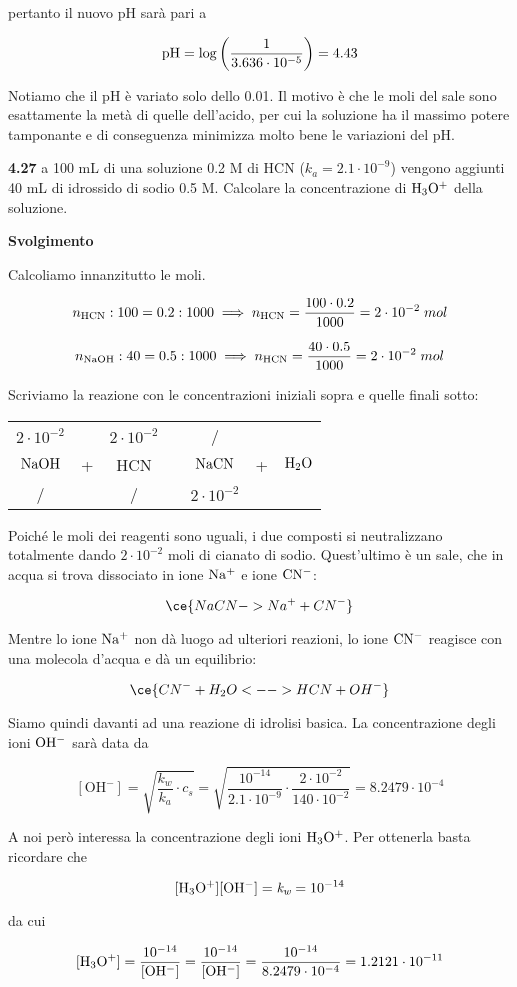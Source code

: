 pertanto il nuovo pH sarà pari a

$$\rm pH=\log{\left(\frac{1}{3.636 \cdot 10^{-5}}\right)}=4.43$$

Notiamo che il pH è variato solo dello 0.01. Il motivo è che le moli del sale sono esattamente la metà di quelle dell'acido, per cui la soluzione ha il massimo potere tamponante e di conseguenza minimizza molto bene le variazioni del pH.

\vspace{0.2cm}\textbf{4.27} a 100 mL di una soluzione 0.2 M di HCN ($k_a=2.1 \cdot 10^{-9}$) vengono aggiunti 40 mL di idrossido di sodio 0.5 M. Calcolare la concentrazione di $\rm H_3O^+$ della soluzione.

\vspace{0.2cm}\large\textbf{Svolgimento}\normalsize

Calcoliamo innanzitutto le moli.

$$n_{\rm HCN}:100=0.2:1000
\implies
n_{\rm HCN}=\frac{100 \cdot 0.2}{1000}=2 \cdot 10^{-2}\;mol$$

$$n_{\rm NaOH}:40=0.5:1000
\implies
n_{\rm HCN}=\frac{40 \cdot 0.5}{1000}=2 \cdot 10^{-2}\;mol$$

Scriviamo la reazione con le concentrazioni iniziali sopra e quelle finali sotto:

\begin{center}
    \begin{tabular}{ccccccc}
        $2 \cdot 10^{-2}$ &  & $2 \cdot 10^{-2}$ & & / &&\\
        $\rm NaOH$ & + & HCN & \ce{->} & $\rm NaCN$ & + & $\rm H_2O$\\
        / &  &  / & & $2 \cdot 10^{-2}$ &&\\
    \end{tabular}
\end{center}

Poiché le moli dei reagenti sono uguali, i due composti si neutralizzano totalmente dando $2 \cdot 10^{-2}$ moli di cianato di sodio. Quest'ultimo è un sale, che in acqua si trova dissociato in ione $\rm Na^+$ e ione $\rm CN^-$:

$$\ce{NaCN -> Na^+ + CN^-}$$

Mentre lo ione $\rm Na^+$ non dà luogo ad ulteriori reazioni, lo ione $\rm CN^-$ reagisce con una molecola d'acqua e dà un equilibrio:

$$\ce{CN^- + H_2O <--> HCN + OH^-}$$

Siamo quindi davanti ad una reazione di idrolisi basica. La concentrazione degli ioni $\rm OH^-$ sarà data da

$$[\text{OH}^-]
=\sqrt{\frac{k_w}{k_a}\cdot c_s}
=\sqrt{\frac{10^{-14}}{2.1 \cdot 10^{-9}} \cdot \frac{2 \cdot 10^{-2}}{140 \cdot 10^{-2}}}
=8.2479 \cdot 10^{-4}$$

A noi però interessa la concentrazione degli ioni $\rm H_3O^+$. Per ottenerla basta ricordare che

$$\rm [H_3O^+][OH^-]=\textit{k}_{\textit{w}}=10^{-14}$$

da cui

$$\rm [H_3O^+]=\frac{10^{-14}}{[OH^-]}
=\frac{10^{-14}}{[OH^-]}
=\frac{10^{-14}}{8.2479 \cdot 10^{-4}}=1.2121 \cdot 10^{-11}$$